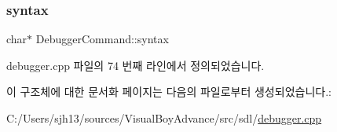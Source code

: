 \subsubsection{\texorpdfstring{syntax}{syntax}}
{\footnotesize\ttfamily char$\ast$ Debugger\+Command\+::syntax}



debugger.\+cpp 파일의 74 번째 라인에서 정의되었습니다.



이 구조체에 대한 문서화 페이지는 다음의 파일로부터 생성되었습니다.\+:\begin{DoxyCompactItemize}
\item 
C\+:/\+Users/sjh13/sources/\+Visual\+Boy\+Advance/src/sdl/\mbox{\hyperlink{debugger_8cpp}{debugger.\+cpp}}\end{DoxyCompactItemize}
